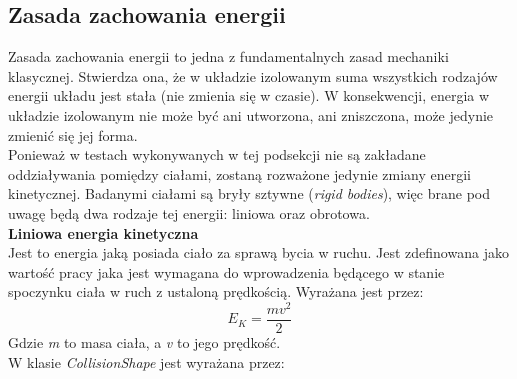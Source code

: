 \subsection{Zasada zachowania energii}
Zasada zachowania energii to jedna z fundamentalnych zasad mechaniki klasycznej.
Stwierdza ona, że w układzie izolowanym suma wszystkich rodzajów energii układu
jest stała (nie zmienia się w czasie). W konsekwencji, energia w układzie
izolowanym nie może być ani utworzona, ani zniszczona, może jedynie zmienić się
jej forma.\\
Ponieważ w testach wykonywanych w tej podsekcji nie są zakładane
oddziaływania pomiędzy ciałami, zostaną rozważone jedynie zmiany energii
kinetycznej. Badanymi ciałami są bryły sztywne (\emph{rigid bodies}), więc brane
pod uwagę będą dwa rodzaje tej energii: liniowa oraz obrotowa.\\
\textbf{Liniowa energia kinetyczna}\\
Jest to energia jaką posiada ciało za sprawą bycia w ruchu. Jest zdefinowana
jako wartość pracy jaka jest wymagana do wprowadzenia będącego w stanie
spoczynku ciała w ruch z ustaloną prędkością. Wyrażana jest przez:
\begin{equation}
E_{K} = \frac{mv^{2}}{2}
\end{equation}
Gdzie \emph{m} to masa ciała, a \emph{v} to jego prędkość.\\
W klasie \emph{CollisionShape} jest wyrażana przez:



